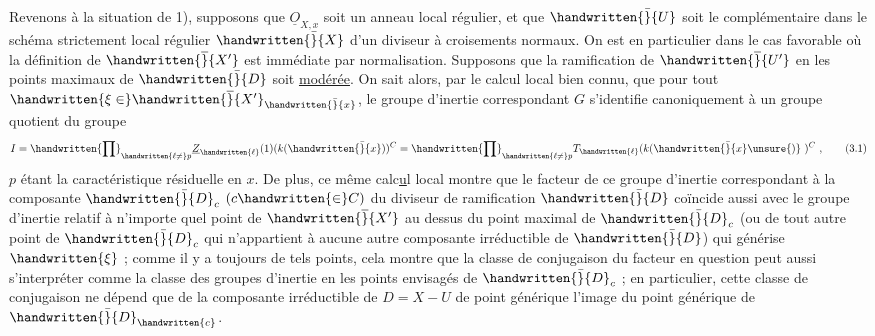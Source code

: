 Revenons à la situation de 1), supposons que $\underline{O}_{X,x}$ soit un anneau local régulier, et que $\handwritten{\bar}{U}$ soit le complémentaire dans le schéma strictement local régulier $\handwritten{\bar}{X}$ d'un diviseur  à croisements normaux. On est en particulier dans le cas favorable où la définition de $\handwritten{\overline}{X'}$ est immédiate par normalisation. Supposons que la ramification de $\handwritten{\overline}{U'}$ en les points maximaux de $\handwritten{\bar}{D}$ soit \uline{modérée}. On sait alors, par le calcul local bien connu, que pour tout $\handwritten{\xi\in}\handwritten{\overline}{X'}_{\handwritten{\bar}{x}}$, le groupe d'inertie correspondant $G$ s'identifie canoniquement  à un groupe quotient du groupe
\[
I=\handwritten{\prod}_{\handwritten{\ell\ne}p}\underline{Z}_{\handwritten{\ell}}(1)(k(\handwritten{\bar}{x}))^C=\handwritten{\prod}_{\handwritten{\ell\ne}p}T_{\handwritten{\ell}}(k(\handwritten{\bar}{x}\unsure{)}\ )^C\ ,
\tag*{(3.1)}
\]
$p$ étant la caractéristique résiduelle en $x$. De plus, ce même calc\uline{u}l local montre que le facteur de ce groupe d'inertie correspondant à la composante $\handwritten{\bar}{D}_c$ $(c\handwritten{\in}C)$ du diviseur de ramification $\handwritten{\bar}{D}$ coïncide aussi avec le groupe d'inertie relatif à n'importe quel point de $\handwritten{\overline}{X'}$ au dessus du point maximal de $\handwritten{\bar}{D}_c$ (ou de tout autre point de $\handwritten{\bar}{D}_c$ qui n'appartient à aucune autre composante irréductible de $\handwritten{\bar}{D}$) qui générise $\handwritten{\xi}$ ; comme il y a toujours de tels points, cela montre que la classe de conjugaison du facteur en question peut aussi s'interpréter comme la  classe des groupes d'inertie en les points envisagés de $\handwritten{\bar}{D}_c$ ; en particulier, cette classe de conjugaison ne dépend que de la composante irréductible de $D=X-U$  de point générique l'image du point générique de $\handwritten{\bar}{D}_{\handwritten{c}}$.


